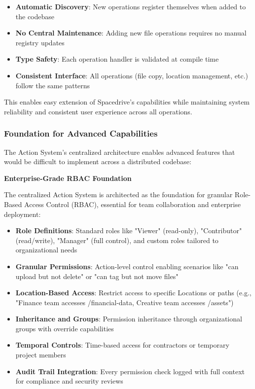 \documentclass[sigconf]{acmart}
\newcommand{\plannedSection}[1]{#1}
\begin{document}
\begin{itemize}[noitemsep, topsep=0pt]
 \item \textbf{Automatic Discovery}: New operations register themselves when added to the codebase
 \item \textbf{No Central Maintenance}: Adding new file operations requires no manual registry updates
 \item \textbf{Type Safety}: Each operation handler is validated at compile time
 \item \textbf{Consistent Interface}: All operations (file copy, location management, etc.) follow the same patterns
\end{itemize}

This enables easy extension of Spacedrive's capabilities while maintaining system reliability and consistent user experience across all operations.

\subsubsection{Foundation for Advanced Capabilities}

The Action System's centralized architecture enables advanced features that would be difficult to implement across a distributed codebase:

\textbf{\plannedSection{Enterprise-Grade RBAC Foundation}}

The centralized Action System is architected as the foundation for granular Role-Based Access Control (RBAC), essential for team collaboration and enterprise deployment:

\begin{itemize}[noitemsep, topsep=0pt]
 \item \textbf{Role Definitions}: Standard roles like "Viewer" (read-only), "Contributor" (read/write), "Manager" (full control), and custom roles tailored to organizational needs
 \item \textbf{Granular Permissions}: Action-level control enabling scenarios like "can upload but not delete" or "can tag but not move files"
 \item \textbf{Location-Based Access}: Restrict access to specific Locations or paths (e.g., "Finance team accesses /financial-data, Creative team accesses /assets")
 \item \textbf{Inheritance and Groups}: Permission inheritance through organizational groups with override capabilities
 \item \textbf{Temporal Controls}: Time-based access for contractors or temporary project members
 \item \textbf{Audit Trail Integration}: Every permission check logged with full context for compliance and security reviews
\end{itemize}
\end{document}
